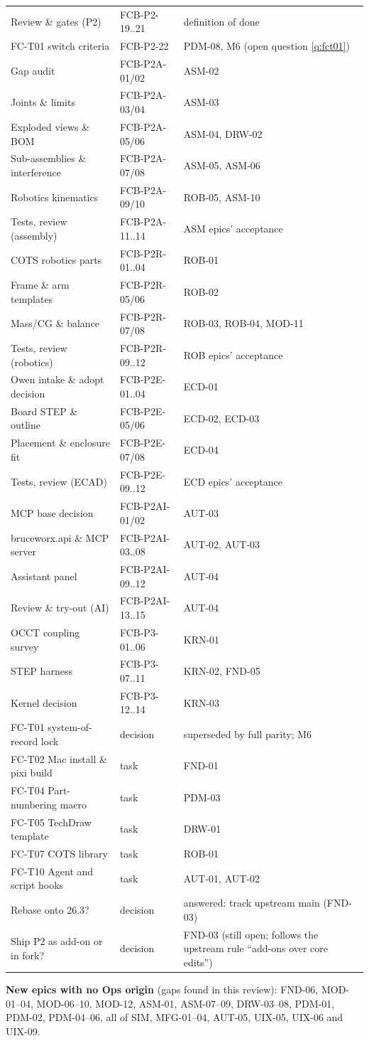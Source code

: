 \begin{center}
\begin{longtable}{@{}p{4.6cm}p{4.2cm}p{6.6cm}@{}}
Review \& gates (P2) & FCB-P2-19..21 & definition of done\\
FC-T01 switch criteria & FCB-P2-22 & PDM-08, M6 (open question \ref{q:fct01})\\
Gap audit & FCB-P2A-01/02 & ASM-02\\
Joints \& limits & FCB-P2A-03/04 & ASM-03\\
Exploded views \& BOM & FCB-P2A-05/06 & ASM-04, DRW-02\\
Sub-assemblies \& interference & FCB-P2A-07/08 & ASM-05, ASM-06\\
Robotics kinematics & FCB-P2A-09/10 & ROB-05, ASM-10\\
Tests, review (assembly) & FCB-P2A-11..14 & ASM epics' acceptance\\
COTS robotics parts & FCB-P2R-01..04 & ROB-01\\
Frame \& arm templates & FCB-P2R-05/06 & ROB-02\\
Mass/CG \& balance & FCB-P2R-07/08 & ROB-03, ROB-04, MOD-11\\
Tests, review (robotics) & FCB-P2R-09..12 & ROB epics' acceptance\\
Owen intake \& adopt decision & FCB-P2E-01..04 & ECD-01\\
Board STEP \& outline & FCB-P2E-05/06 & ECD-02, ECD-03\\
Placement \& enclosure fit & FCB-P2E-07/08 & ECD-04\\
Tests, review (ECAD) & FCB-P2E-09..12 & ECD epics' acceptance\\
MCP base decision & FCB-P2AI-01/02 & AUT-03\\
bruceworx.api \& MCP server & FCB-P2AI-03..08 & AUT-02, AUT-03\\
Assistant panel & FCB-P2AI-09..12 & AUT-04\\
Review \& try-out (AI) & FCB-P2AI-13..15 & AUT-04\\
OCCT coupling survey & FCB-P3-01..06 & KRN-01\\
STEP harness & FCB-P3-07..11 & KRN-02, FND-05\\
Kernel decision & FCB-P3-12..14 & KRN-03\\
\midrule
FC-T01 system-of-record lock & decision & superseded by full parity; M6\\
FC-T02 Mac install \& pixi build & task & FND-01\\
FC-T04 Part-numbering macro & task & PDM-03\\
FC-T05 TechDraw template & task & DRW-01\\
FC-T07 COTS library & task & ROB-01\\
FC-T10 Agent and script hooks & task & AUT-01, AUT-02\\
Rebase onto 26.3? & decision & answered: track upstream main (FND-03)\\
Ship P2 as add-on or in fork? & decision & FND-03 (still open; follows the upstream rule ``add-ons over core edits'')\\
\end{longtable}
\end{center}

\noindent
\textbf{New epics with no Ops origin} (gaps found in this review): FND-06, MOD-01--04, MOD-06--10,
MOD-12, ASM-01, ASM-07--09, DRW-03--08, PDM-01, PDM-02, PDM-04--06, all of SIM, MFG-01--04, AUT-05, UIX-05,
UIX-06 and UIX-09.
